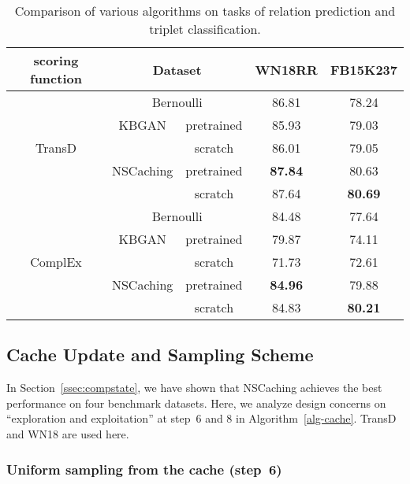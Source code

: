 \documentclass[conference]{IEEEtran}
\begin{document}
\begin{table}[H]
	\centering
\caption{Comparison of various algorithms on tasks of relation prediction and triplet classification.} 
	\label{tb:classification}
\scalebox{0.9}
	{
		\renewcommand{\arraystretch}{1.2}
		\begin{tabular}{c|cc|c|c}
			\hline
			scoring     function     &  \multicolumn{2}{c|}{Dataset}  &                {WN18RR}                   & {FB15K237}  \\ \hline
			\multirow{5}{*}{TransD}  & \multicolumn{2}{c|}{Bernoulli} &       86.81          &  78.24   \\
			&   KBGAN   &     pretrained     &  85.93    &  79.03   \\
			&           &      scratch       &   86.01   &79.05   \\
			& NSCaching &     pretrained     &          \textbf{87.84}          &   80.63   \\
			&           &      scratch       &      87.64          &  \textbf{80.69}   \\ \hline
			\multirow{5}{*}{ComplEx} & \multicolumn{2}{c|}{Bernoulli} &        84.48          & 77.64   \\
			&   KBGAN   &     pretrained     &  79.87  &    74.11  \\
			&           &      scratch       &    71.73  &   72.61    \\
			& NSCaching &     pretrained     &         \textbf{84.96}          &   79.88   \\
			&           &      scratch       &        84.83          &  \textbf{80.21}   \\ \hline
		\end{tabular}
	}
\end{table}


\subsection{Cache Update and Sampling Scheme}
\label{sec:ablation}

In Section~\ref{ssec:compstate},
we have shown that NSCaching achieves the best performance on four benchmark datasets.
Here,
we analyze design concerns on ``exploration and exploitation''
at step~6 and 8 in Algorithm~\ref{alg-cache}.
TransD and WN18 are used here.

\subsubsection{Uniform sampling from the cache (step~6)}
\label{sec:exp:sample-cache}
\end{document}
